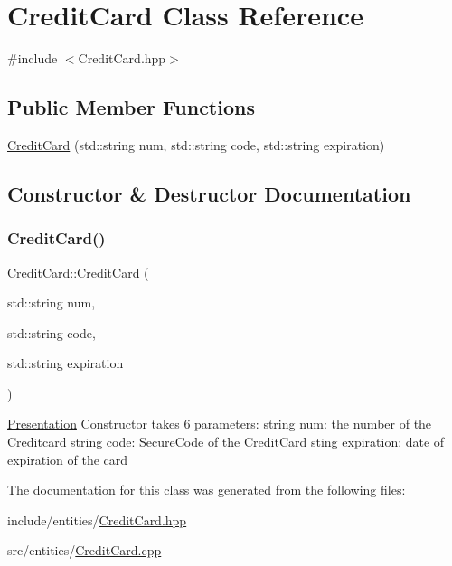 \hypertarget{class_credit_card}{}\section{Credit\+Card Class Reference}
\label{class_credit_card}


{\ttfamily \#include $<$Credit\+Card.\+hpp$>$}

\subsection*{Public Member Functions}
\begin{DoxyCompactItemize}
\item 
\mbox{\hyperlink{class_credit_card_a5ac752fc539cfa8ac4f30a35a300e072}{Credit\+Card}} (std\+::string num, std\+::string code, std\+::string expiration)
\end{DoxyCompactItemize}


\subsection{Constructor \& Destructor Documentation}
\mbox{\label{class_credit_card_a5ac752fc539cfa8ac4f30a35a300e072}} 
\subsubsection{\texorpdfstring{CreditCard()}{CreditCard()}}
{\footnotesize\ttfamily Credit\+Card\+::\+Credit\+Card (\begin{DoxyParamCaption}\item[{std\+::string}]{num,  }\item[{std\+::string}]{code,  }\item[{std\+::string}]{expiration }\end{DoxyParamCaption})}

\mbox{\hyperlink{class_presentation}{Presentation}} Constructor takes 6 parameters\+: string num\+: the number of the Creditcard string code\+: \mbox{\hyperlink{class_secure_code}{Secure\+Code}} of the \mbox{\hyperlink{class_credit_card}{Credit\+Card}} sting expiration\+: date of expiration of the card 

The documentation for this class was generated from the following files\+:\begin{DoxyCompactItemize}
\item 
include/entities/\mbox{\hyperlink{_credit_card_8hpp}{Credit\+Card.\+hpp}}\item 
src/entities/\mbox{\hyperlink{_credit_card_8cpp}{Credit\+Card.\+cpp}}\end{DoxyCompactItemize}
